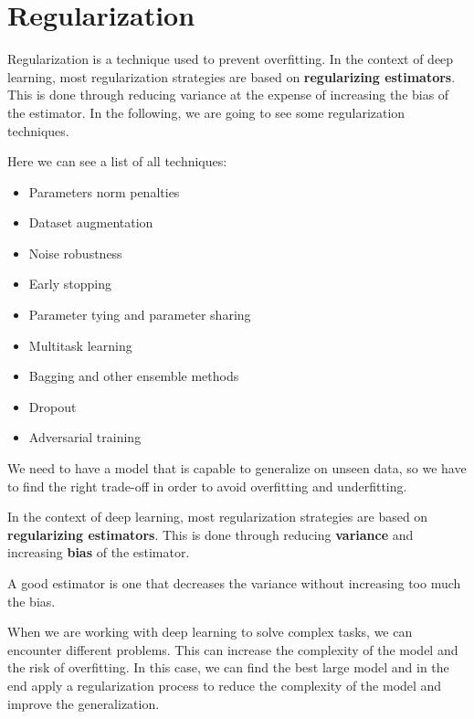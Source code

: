 \section{Regularization}
Regularization is a technique used to prevent overfitting. In the context of
deep learning, most regularization strategies are based on \textbf{regularizing
    estimators}. This is done through reducing variance at the expense of
increasing the bias of the estimator. In the following, we are going to see some
regularization techniques.

Here we can see a list of all techniques:
\begin{itemize}
    \item Parameters norm penalties
    \item Dataset augmentation
    \item Noise robustness
    \item Early stopping
    \item Parameter tying and parameter sharing
    \item Multitask learning
    \item Bagging and other ensemble methods
    \item Dropout
    \item Adversarial training
\end{itemize}

We need to have a model that is capable to generalize on unseen data, so we have
to find the right trade-off in order to avoid overfitting and underfitting.

In the context of deep learning, most regularization strategies are based on
\textbf{regularizing estimators}. This is done through reducing \textbf{variance}
and increasing \textbf{bias} of the estimator.
\begin{note}
    A good estimator is one that decreases the variance without increasing too
    much the bias.
\end{note}

When we are working with deep learning to solve complex tasks, we can encounter
different problems. This can increase the complexity of the model and the risk of
overfitting. In this case, we can find the best large model and in the end apply
a regularization process to reduce the complexity of the model and improve the
generalization.


